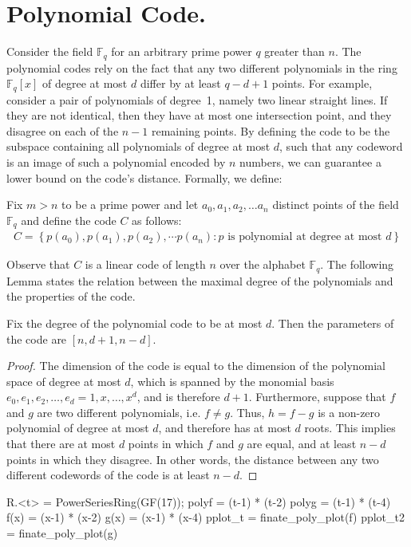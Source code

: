 
\newcommand{\FF}{\mathbb{F}_{q}}
\section{Polynomial Code.} Consider the field $\FF$ for an arbitrary prime power $q$ greater than $n$. The polynomial codes rely on the fact that any two different polynomials in the ring $\FF\left[ x \right]$ of degree at most $d$ differ by at least $q - d + 1$ points. For example, consider a pair of polynomials of degree~1, namely two linear straight lines. If they are not identical, then they have at most one intersection point, and they disagree on each of the $n-1$ remaining points. By defining the code to be the subspace containing all polynomials of degree at most $d$, such that any codeword is an image of such a polynomial encoded by $n$ numbers, we can guarantee a lower bound on the code's distance. Formally, we define:

\begin{definition}
  Fix $m > n $ to be a prime power and let $a_{0},a_{1},a_{2},\ldots a_{n}$ distinct points of the field $\FF$  and define the code $C$ as follows:  
  \begin{equation*}
    \begin{split}
      C = \left\{p\left(a_{0}\right),p\left(a_{1}\right),p\left(a_{2}\right),\cdots p\left(a_{n}\right) : p \text{ is polynomial at degree at most } d \right\}
    \end{split}
  \end{equation*}
\end{definition}
Observe that $C$ is a linear code of length $n$ over the alphabet $\FF$. The following Lemma states the relation between the maximal degree of the polynomials and the properties of the code.
\begin{lemma}
Fix the degree of the polynomial code to be at most $d$. Then the parameters of the code are $[n, d+1, n-d]$.
  \label{polycode}
\end{lemma}
\begin{proof}
The dimension of the code is equal to the dimension of the polynomial space of degree at most $d$, which is spanned by the monomial basis $e_{0}, e_{1}, e_{2}, \dots, e_{d} = 1, x, \dots, x^{d}$, and is therefore $d+1$. Furthermore, suppose that $f$ and $g$ are two different polynomials, i.e. $f \neq g$. Thus, $h = f-g$ is a non-zero polynomial of degree at most $d$, and therefore has at most $d$ roots. This implies that there are at most $d$ points in which $f$ and $g$ are equal, and at least $n-d$ points in which they disagree. In other words, the distance between any two different codewords of the code is at least $n-d$.
\end{proof}
\begin{sagesilent}
R.<t> = PowerSeriesRing(GF(17));
polyf = (t-1) * (t-2)
polyg = (t-1) * (t-4)
f(x) = (x-1) * (x-2)
g(x) = (x-1) * (x-4)
pplot_t = finate_poly_plot(f)
pplot_t2 = finate_poly_plot(g)
\end{sagesilent}
 
\begin{figure}[H]
  \label{fig:polyexample}
\end{figure}



